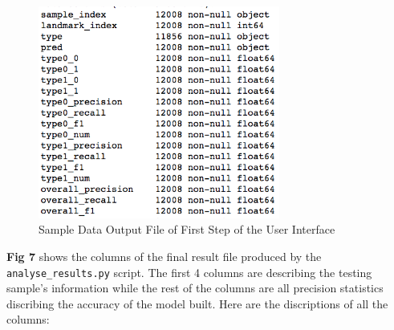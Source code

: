 \documentclass[10pt,letterpaper]{article}
\begin{document}
\begin{figure}[h]

{\centering \includegraphics[width=300px]{figures/Figure5} 

}

\caption{Sample Data Output File of First Step of the User Interface}\label{fig:outputdata}
\end{figure}

\textbf{Fig 7} shows the columns of the final result file produced by
the \texttt{analyse\_results.py} script. The first 4 columns are
describing the testing sample's information while the rest of the
columns are all precision statistics discribing the accuracy of the
model built. Here are the discriptions of all the columns:
\end{document}
